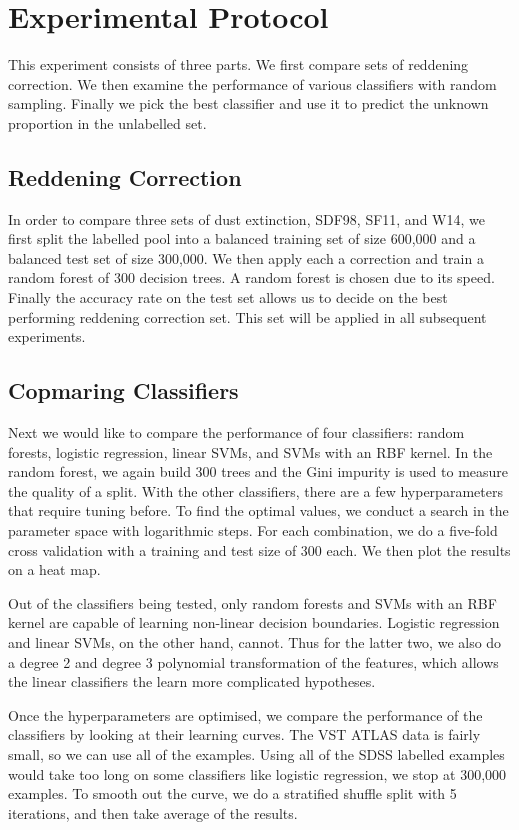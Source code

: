 \section{Experimental Protocol}
\label{sec:protocol1}

This experiment consists of three parts. We first compare sets of reddening correction.
We then examine the performance of various classifiers with random sampling. Finally
we pick the best classifier and use it to predict the unknown proportion in the unlabelled
set.

\subsection{Reddening Correction}
In order to compare three sets of dust extinction, SDF98, SF11, and W14, we first
split the labelled pool into a balanced training set of size 600,000 and a balanced test
set of size 300,000. We then apply each a correction and train a random forest of 300 decision
trees. A random forest is chosen due to its speed. Finally the accuracy rate on the test set allows
us to decide on the best performing reddening correction set. This set will be applied
in all subsequent experiments.

\subsection{Copmaring Classifiers}
Next we would like to compare the performance of four classifiers: random forests, logistic
regression, linear SVMs, and SVMs with an RBF kernel. In the random forest,
we again build 300 trees and the
Gini impurity is used to measure the quality of a split. With the other classifiers,
there
are a few hyperparameters that require tuning before. To find the optimal values,
we conduct a search in the parameter space with logarithmic steps. For each combination,
we do a five-fold cross validation with a training and test size of 300 each. We then plot
the results on a heat map.

Out of the classifiers being tested, only random forests and SVMs with
an RBF kernel are capable of learning non-linear decision boundaries. Logistic regression
and linear SVMs, on the other hand, cannot. Thus for the latter two, we also do a degree
2 and degree 3 polynomial transformation of the features, which allows the linear classifiers
the learn more complicated hypotheses.

Once the hyperparameters are optimised, we compare the performance of the classifiers by looking
at their learning curves. The VST ATLAS data is fairly small, so we can use all of the examples.
Using all of the SDSS labelled examples would take too long on some classifiers like
logistic regression, we stop at 300,000 examples. To smooth out the curve, we do a
stratified shuffle split with 5 iterations, and then take average of the results.


